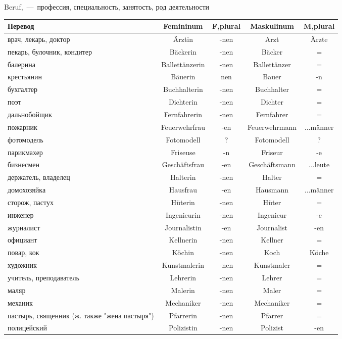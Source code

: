 
 Beruf,~---~профессия, специальность, занятость, род деятельности

\begin{longtable}{|p{4cm}|c|c|c|c|}
\hline
Перевод & Femininum & F,plural & Maskulinum & M,plural \\
\hline\endhead

 врач, лекарь, доктор & \"Arztin & -nen & Arzt & \"Arzte \\
 пекарь, булочник, кондитер & B\"ackerin & -nen & B\"acker & = \\
 балерина & Ballett\"anzerin & -nen & Ballett\"anzer & = \\
 крестьянин & B\"auerin & nen & Bauer & -n \\
 бухгалтер & Buchhalterin & -nen & Buchhalter & = \\
 поэт & Dichterin & -nen & Dichter & = \\
 дальнобойщик & Fernfahrerin & -nen & Fernfahrer & = \\
 пожарник & Feuerwehrfrau & -en & Feuerwehrmann & ...m\"anner \\
 фотомодель & Fotomodell & ? & Fotomodell & ? \\
 парикмахер & Friseuse & -n & Friseur & -e \\
 бизнесмен & Gesch\"aftsfrau & -en & Gesch\"aftsmann & ...leute \\
 держатель, владелец & Halterin & -nen & Halter & = \\
 домохозяйка & Hausfrau & -en & Hausmann & ...m\"anner \\
 сторож, пастух & H\"uterin & -nen & H\"uter & = \\
 инженер & Ingenieurin & -nen & Ingenieur & -e \\
 журналист & Journalistin & -en & Journalist & -en \\
 официант & Kellnerin & -nen & Kellner & = \\
 повар, кок & K\"ochin & -nen & Koch & K\"oche \\
 художник & Kunstmalerin & -nen & Kunstmaler & = \\
 учитель, преподаватель & Lehrerin & -nen & Lehrer & = \\
 маляр & Malerin & -nen & Maler & = \\
 механик & Mechaniker & -nen & Mechaniker & = \\
 пастырь, священник (ж. также "жена пастыря") & Pfarrerin & -nen & Pfarrer & = \\
 полицейский & Polizistin & -nen & Polizist & -en \\

\end{longtable}
